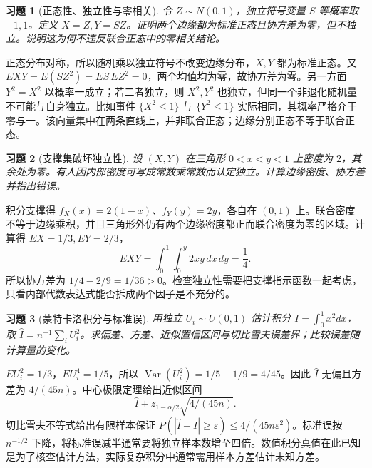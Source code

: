 \documentclass[UTF8,12pt,a4paper,fontset=fandol]{ctexart}
\newtheorem{exercise}{习题}[section]
\begin{document}
\begin{exercise}[正态性、独立性与零相关]\label{q:B17.15}
令 $Z\sim N(0,1)$，独立符号变量 $S$ 等概率取 $-1,1$。定义 $X=Z,Y=SZ$。证明两个边缘都为标准正态且协方差为零，但不独立。说明这为何不违反联合正态中的零相关结论。\par{}
\end{exercise}

\begin{solve}\label{a:B17.15}正态分布对称，所以随机乘以独立符号不改变边缘分布，$X,Y$ 都为标准正态。又 $EXY=E(SZ^2)=ES\,EZ^2=0$，两个均值均为零，故协方差为零。另一方面 $Y^2=X^2$ 以概率一成立；若二者独立，则 $X^2,Y^2$ 也独立，但同一个非退化随机量不可能与自身独立。比如事件 $\{X^2\le1\}$ 与 $\{Y^2\le1\}$ 实际相同，其概率严格介于零与一。该向量集中在两条直线上，并非联合正态；边缘分别正态不等于联合正态。\end{solve}

\begin{exercise}[支撑集破坏独立性]\label{q:B17.16}
设 $(X,Y)$ 在三角形 $0<x<y<1$ 上密度为 $2$，其余处为零。有人因内部密度可写成常数乘常数而认定独立。计算边缘密度、协方差并指出错误。\par{}
\end{exercise}

\begin{solve}\label{a:B17.16}积分支撑得 $f_X(x)=2(1-x)$、$f_Y(y)=2y$，各自在 $(0,1)$ 上。联合密度不等于边缘乘积，并且三角形外仍有两个边缘密度都正而联合密度为零的区域。计算得 $EX=1/3,EY=2/3$，\[EXY=\int_0^1\int_0^y2xy\,dx\,dy=\frac14.\]所以协方差为 $1/4-2/9=1/36>0$。检查独立性需要把支撑指示函数一起考虑，只看内部代数表达式能否拆成两个因子是不充分的。\end{solve}

\begin{exercise}[蒙特卡洛积分与标准误]\label{q:B17.17}
用独立 $U_i\sim U(0,1)$ 估计积分 $I=\int_0^1x^2dx$，取 $\widehat I=n^{-1}\sum_iU_i^2$。求偏差、方差、近似置信区间与切比雪夫误差界；比较误差随计算量的变化。\par{}
\end{exercise}

\begin{solve}\label{a:B17.17}$EU_i^2=1/3$，$EU_i^4=1/5$，所以 $\operatorname{Var}(U_i^2)=1/5-1/9=4/45$。因此 $\widehat I$ 无偏且方差为 $4/(45n)$。中心极限定理给出近似区间\[\widehat I\pm z_{1-\alpha/2}\sqrt{4/(45n)}.\]切比雪夫不等式给出有限样本保证 $P(|\widehat I-I|\ge\varepsilon)\le4/(45n\varepsilon^2)$。标准误按 $n^{-1/2}$ 下降，将标准误减半通常要将独立样本数增至四倍。数值积分真值在此已知是为了核查估计方法，实际复杂积分中通常需用样本方差估计未知方差。\end{solve}
\end{document}
